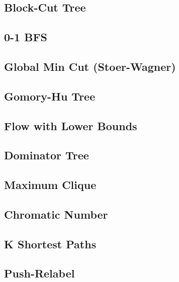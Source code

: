 \documentclass[10pt,letterpaper,landscape,twocolumn]{article}
\begin{document}
\subsection{Block-Cut Tree}

\subsection{0-1 BFS}


\subsection{Global Min Cut (Stoer-Wagner)}

\subsection{Gomory-Hu Tree}

\subsection{Flow with Lower Bounds}

\subsection{Dominator Tree}

\subsection{Maximum Clique}

\subsection{Chromatic Number}

\subsection{K Shortest Paths}

\subsection{Push-Relabel}

\end{document}
